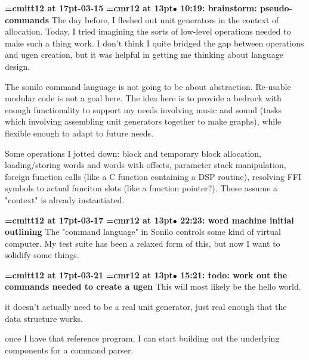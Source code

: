 {\medskip\noindent\bf\font\titlefont=cmitt12 at 17pt-03-15}\medskip
{\smallskip\noindent\bf\font\titlefont=cmr12 at 13pt\titlefont $\bullet$ 10:19: brainstorm: pseudo-commands}\smallskip
The day before, I fleshed out unit generators in the context of allocation. Today, I tried imagining the sorts of low-level operations needed to make such a thing work. I don't think I quite bridged the gap between operations and ugen creation, but it was helpful in getting me thinking about language design.
\par

The sonilo command language is not going to be about abstraction. Re-usable modular code is not a goal here. The idea here is to provide a bedrock with enough functionality to support my needs involving music and sound (tasks which involving assembling unit generators together to make graphs), while flexible enough to adapt to future needs.
\par

Some operations I jotted down: block and temporary block allocation, loading/storing words and words with offsets, parameter stack manipulation, foreign function calls (like a C function containing a DSP routine), resolving FFI symbols to actual funciton slots (like a function pointer?). These assume a "context" is already instantiated.
\par

{\medskip\noindent\bf\font\titlefont=cmitt12 at 17pt-03-17}\medskip
{\smallskip\noindent\bf\font\titlefont=cmr12 at 13pt\titlefont $\bullet$ 22:23: word machine initial outlining}\smallskip
The "command language" in Sonilo controls some kind of virtual computer. My test suite has been a relaxed form of this, but now I want to solidify some things.
\par

{\medskip\noindent\bf\font\titlefont=cmitt12 at 17pt-03-21}\medskip
{\smallskip\noindent\bf\font\titlefont=cmr12 at 13pt\titlefont $\bullet$ 15:21: todo: work out the commands needed to create a ugen}\smallskip
This will most likely be the hello world.
\par

it doesn't actually need to be a real unit generator, just real enough that the data structure works.
\par

once I have that reference program, I can start building out the underlying components for a command parser.
\par

